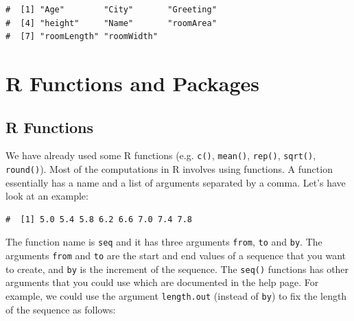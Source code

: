 \documentclass[a4paper,9pt,twocolumn,twoside,printwatermark=false]{pinp}
\begin{document}
\begin{ShadedResult}
\begin{verbatim}
#  [1] "Age"        "City"       "Greeting"  
#  [4] "height"     "Name"       "roomArea"  
#  [7] "roomLength" "roomWidth"
\end{verbatim}
\end{ShadedResult}

\section{R Functions and Packages}\label{r-functions-and-packages}

\subsection{R Functions}\label{r-functions}

We have already used some R functions (e.g. \texttt{c()},
\texttt{mean()}, \texttt{rep()}, \texttt{sqrt()}, \texttt{round()}).
Most of the computations in R involves using functions. A function
essentially has a name and a list of arguments separated by a comma.
Let's have look at an example:

\begin{Shaded}
\begin{Highlighting}[]
\NormalTok{(} \NormalTok{, } \NormalTok{, } \NormalTok{)}
\end{Highlighting}
\end{Shaded}

\begin{ShadedResult}
\begin{verbatim}
#  [1] 5.0 5.4 5.8 6.2 6.6 7.0 7.4 7.8
\end{verbatim}
\end{ShadedResult}

The function name is \texttt{seq} and it has three arguments
\texttt{from}, \texttt{to} and \texttt{by}. The arguments \texttt{from}
and \texttt{to} are the start and end values of a sequence that you want
to create, and \texttt{by} is the increment of the sequence. The
\texttt{seq()} functions has other arguments that you could use which
are documented in the help page. For example, we could use the argument
\texttt{length.out} (instead of \texttt{by}) to fix the length of the
sequence as follows:

\begin{Shaded}
\begin{Highlighting}[]
\NormalTok{(} \NormalTok{, } \NormalTok{, } \NormalTok{)}
\end{Highlighting}
\end{Shaded}
\end{document}
